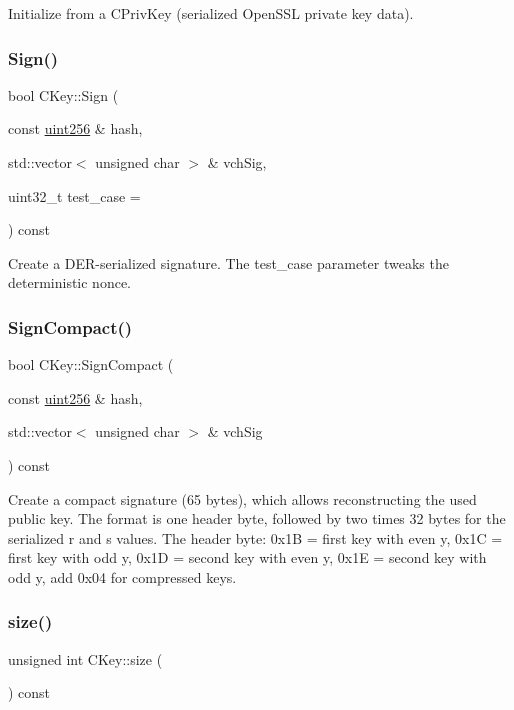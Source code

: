 Initialize from a C\+Priv\+Key (serialized Open\+S\+SL private key data). 

\mbox{\label{class_c_key_aa9b184a4a71d3e1a40aab360cf68e86c}} 
\subsubsection{\texorpdfstring{Sign()}{Sign()}}
{\footnotesize\ttfamily bool C\+Key\+::\+Sign (\begin{DoxyParamCaption}\item[{const \mbox{\hyperlink{classuint256}{uint256}} \&}]{hash,  }\item[{std\+::vector$<$ unsigned char $>$ \&}]{vch\+Sig,  }\item[{uint32\+\_\+t}]{test\+\_\+case = {} }\end{DoxyParamCaption}) const}

Create a D\+E\+R-\/serialized signature. The test\+\_\+case parameter tweaks the deterministic nonce. \mbox{\label{class_c_key_afe77d80889aa68e92e6882e75424cfb8}} 
\subsubsection{\texorpdfstring{Sign\+Compact()}{SignCompact()}}
{\footnotesize\ttfamily bool C\+Key\+::\+Sign\+Compact (\begin{DoxyParamCaption}\item[{const \mbox{\hyperlink{classuint256}{uint256}} \&}]{hash,  }\item[{std\+::vector$<$ unsigned char $>$ \&}]{vch\+Sig }\end{DoxyParamCaption}) const}

Create a compact signature (65 bytes), which allows reconstructing the used public key. The format is one header byte, followed by two times 32 bytes for the serialized r and s values. The header byte\+: 0x1B = first key with even y, 0x1C = first key with odd y, 0x1D = second key with even y, 0x1E = second key with odd y, add 0x04 for compressed keys. \mbox{\label{class_c_key_a468a9a8cd148ab4a43e7d76bbdc78abe}} 
\subsubsection{\texorpdfstring{size()}{size()}}
{\footnotesize\ttfamily unsigned int C\+Key\+::size (\begin{DoxyParamCaption}{ }\end{DoxyParamCaption}) const\hspace{0.3cm}{\ttfamily [inline]}}




